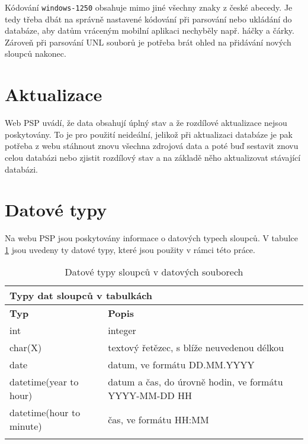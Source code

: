 \noindent Kódování \lstinline|windows-1250| obsahuje mimo jiné všechny znaky z české abecedy. Je tedy třeba dbát na správně nastavené kódování při parsování nebo ukládání do databáze, aby datům vráceným mobilní aplikaci nechyběly např. háčky a čárky. Zároveň při parsování UNL souborů je potřeba brát ohled na přidávání nových sloupců nakonec.

\section{Aktualizace}
Web PSP \cite{psp-data} uvádí, že data obsahují úplný stav a že rozdílové aktualizace nejsou poskytovány. To je pro použití neideální, jelikož při aktualizaci databáze je pak potřeba z webu stáhnout znovu všechna zdrojová data a poté buď sestavit znovu celou databázi nebo zjistit rozdílový stav a na základě něho aktualizovat stávající databázi.

\section{Datové typy}
Na webu PSP \cite{psp-data} jsou poskytovány informace o datových typech sloupců. V tabulce \ref{table:data_types} jsou uvedeny ty datové typy, které jsou použity v rámci této práce.

\begin{longtable}{|l|p{9cm}|} \hline
	\multicolumn{2}{|l|}{\textbf{Typy dat sloupců v tabulkách}} \\ \hline
	\textbf{Typ} & \textbf{Popis} \\ \hline
	
	int	& integer \\ \hline
	
	char(X)		& textový řetězec, s blíže neuvedenou délkou
	\\ \hline

	date	& datum, ve formátu DD.MM.YYYY
	\\ \hline	
	
	datetime(year to hour)		& datum a čas, do úrovně hodin, ve formátu YYYY-MM-DD HH
	
	\\ \hline
	
	datetime(hour to minute)		& čas, ve formátu HH:MM
	\\ \hline
	
	\caption{Datové typy sloupců v datových souborech \cite{psp-data}}
	\label{table:data_types}
\end{longtable}


